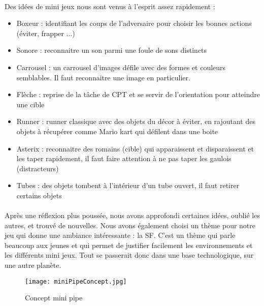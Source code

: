 \paragraph{}Des idées de mini jeux nous sont venus à l'esprit assez rapidement :
\begin{itemize}
\item Boxeur : identifiant les coups de l'adversaire pour choisir les bonnes actions (éviter, frapper ...)
\item Sonore : reconnaitre un son parmi une foule de sons distincts
\item Carrousel : un carrousel d'images défile avec des formes et couleurs semblables. Il faut reconnaitre une image en particulier.
\item Flèche : reprise de la tâche de CPT et se servir de l'orientation pour atteindre une cible
\item Runner : runner classique avec des objets du décor à éviter, en rajoutant des objets à récupérer comme Mario kart qui défilent dans une boite
\item Asterix : reconnaitre des romains (cible) qui apparaissent et disparaissent et les taper rapidement, il faut faire attention à ne pas taper les gaulois (distracteurs)
\item Tubes : des objets tombent à l'intérieur d'un tube ouvert, il faut retirer certains objets
\end{itemize}

\paragraph{}Après une réflexion plus poussée, nous avons approfondi certaines idées, oublié les autres, et trouvé de nouvelles. Nous avons également choisi un thème pour notre jeu qui
donne une ambiance intéressante : la \gls{SF}. C'est un thème qui parle beaucoup aux jeunes et qui permet de justifier facilement les environnements et les différents mini jeux. Tout
se passerait donc dans une base technologique, sur une autre planète.


\begin{wrapfigure}[11]{l}{6cm}
    \vspace{-25pt}
    \begin{center}
    \texttt{[image: miniPipeConcept.jpg]}
    \end{center}
    \captionsetup{labelformat=simpleNumber}
    \caption{Concept mini pipe}
\label{MiniPipeConcept}
\end{wrapfigure}

